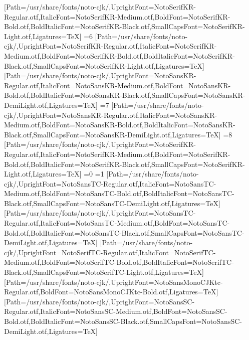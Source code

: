 [Path=/usr/share/fonts/noto-cjk/,UprightFont=NotoSerifKR-Regular.otf,ItalicFont=NotoSerifKR-Medium.otf,BoldFont=NotoSerifKR-Bold.otf,BoldItalicFont=NotoSerifKR-Black.otf,SmallCapsFont=NotoSerifKR-Light.otf,Ligatures=TeX]
\else\ifnum\value{CJKFonts}=6
[Path=/usr/share/fonts/noto-cjk/,UprightFont=NotoSerifKR-Regular.otf,ItalicFont=NotoSerifKR-Medium.otf,BoldFont=NotoSerifKR-Bold.otf,BoldItalicFont=NotoSerifKR-Black.otf,SmallCapsFont=NotoSerifKR-Light.otf,Ligatures=TeX]
[Path=/usr/share/fonts/noto-cjk/,UprightFont=NotoSansKR-Regular.otf,ItalicFont=NotoSansKR-Medium.otf,BoldFont=NotoSansKR-Bold.otf,BoldItalicFont=NotoSansKR-Black.otf,SmallCapsFont=NotoSansKR-DemiLight.otf,Ligatures=TeX]
\else\ifnum\value{CJKFonts}=7
[Path=/usr/share/fonts/noto-cjk/,UprightFont=NotoSansKR-Regular.otf,ItalicFont=NotoSansKR-Medium.otf,BoldFont=NotoSansKR-Bold.otf,BoldItalicFont=NotoSansKR-Black.otf,SmallCapsFont=NotoSansKR-DemiLight.otf,Ligatures=TeX]
\else\ifnum\value{CJKFonts}=8
[Path=/usr/share/fonts/noto-cjk/,UprightFont=NotoSerifKR-Regular.otf,ItalicFont=NotoSerifKR-Medium.otf,BoldFont=NotoSerifKR-Bold.otf,BoldItalicFont=NotoSerifKR-Black.otf,SmallCapsFont=NotoSerifKR-Light.otf,Ligatures=TeX]
\fi\fi\fi\fi\fi\fi\fi\fi\fi\fi\fi\fi\fi\fi
\ifnum\value{NotoCJKFamily}=0
\else\ifnum\value{NotoCJKFamily}=1
\newfontfamily{}[Path=/usr/share/fonts/noto-cjk/,UprightFont=NotoSansTC-Regular.otf,ItalicFont=NotoSansTC-Medium.otf,BoldFont=NotoSansTC-Bold.otf,BoldItalicFont=NotoSansTC-Black.otf,SmallCapsFont=NotoSansTC-DemiLight.otf,Ligatures=TeX]
\newfontfamily{}[Path=/usr/share/fonts/noto-cjk/,UprightFont=NotoSansTC-Regular.otf,ItalicFont=NotoSansTC-Medium.otf,BoldFont=NotoSansTC-Bold.otf,BoldItalicFont=NotoSansTC-Black.otf,SmallCapsFont=NotoSansTC-DemiLight.otf,Ligatures=TeX]
\newfontfamily{}[Path=/usr/share/fonts/noto-cjk/,UprightFont=NotoSerifTC-Regular.otf,ItalicFont=NotoSerifTC-Medium.otf,BoldFont=NotoSerifTC-Bold.otf,BoldItalicFont=NotoSerifTC-Black.otf,SmallCapsFont=NotoSerifTC-Light.otf,Ligatures=TeX]
\newfontfamily{}[Path=/usr/share/fonts/noto-cjk/,UprightFont=NotoSansMonoCJKtc-Regular.otf,BoldFont=NotoSansMonoCJKtc-Bold.otf,Ligatures=TeX]
\newfontfamily{}[Path=/usr/share/fonts/noto-cjk/,UprightFont=NotoSansSC-Regular.otf,ItalicFont=NotoSansSC-Medium.otf,BoldFont=NotoSansSC-Bold.otf,BoldItalicFont=NotoSansSC-Black.otf,SmallCapsFont=NotoSansSC-DemiLight.otf,Ligatures=TeX]
